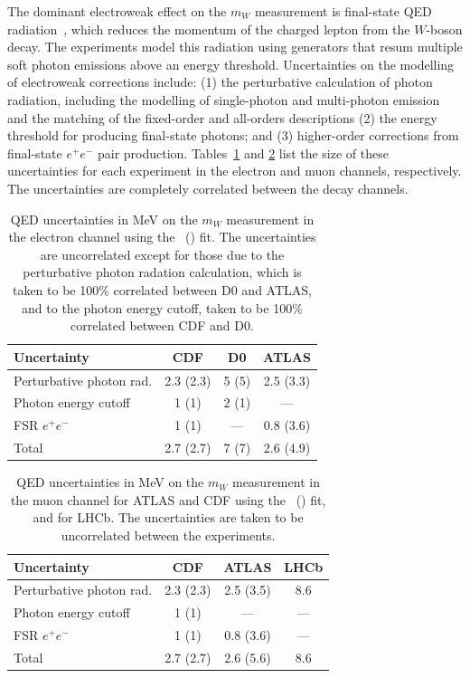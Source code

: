 The dominant electroweak effect on the $m_W$ measurement is final-state QED radiation~\cite{EWK},
which reduces the momentum of the charged lepton from the $W$-boson decay.
The experiments model this radiation using generators that resum multiple soft photon
emissions above an energy threshold. Uncertainties on the modelling of electroweak
corrections include:
(1) the perturbative calculation of photon radiation, including the modelling of single-photon and multi-photon
emission and the matching of the fixed-order and all-orders descriptions
(2) the energy threshold for producing final-state photons; and 
(3) higher-order corrections from final-state $e^+ e^-$ pair production.
Tables~\ref{tbl:ewkelectrons} and  \ref{tbl:ewkmuons} list the size of these uncertainties
for each experiment in the electron and muon channels, respectively.
The uncertainties are completely correlated between the decay channels.

\begin{table}[!tp]
  \centering 
  \begin{tabular}{lccc}
  \hline \hline 
     Uncertainty        & CDF       & D0     & ATLAS     \\ 
     \hline 
    Perturbative photon rad.   & 2.3 (2.3) & 5 (5) & 2.5 (3.3) \\ 
    Photon energy cutoff  & 1 (1)  & 2 (1) & ---    \\
    FSR $e^+e^-$       & 1 (1)     & ---  & 0.8 (3.6) \\
    \hline 
    Total              & 2.7 (2.7)     & 7 (7) & 2.6 (4.9) \\
    \hline \hline 
  \end{tabular}
  \caption{QED uncertainties in MeV on the $m_W$ measurement in the electron 
  channel using the \mT~(\pT) fit.  The uncertainties are uncorrelated except
  for those due to the perturbative photon radation calculation, which is taken
  to be 100\% correlated between D0 and ATLAS, and to the
  photon energy cutoff, taken to be 100\% correlated between CDF and D0. 
  }  
\label{tbl:ewkelectrons}
\end{table}

\begin{table}[!tp]
  \centering 
  \begin{tabular}{lccc}
  \hline \hline 
    Uncertainty          & CDF       & ATLAS     & LHCb \\
    \hline 
    Perturbative photon rad.   & 2.3 (2.3) & 2.5 (3.5) & 8.6 \\
    Photon energy cutoff & 1 (1)  & ---          & --- \\ 
    FSR $e^+e^-$         & 1 (1)     & 0.8 (3.6) & --- \\ 
    Total                & 2.7 (2.7) & 2.6 (5.6) & 8.6 \\
\hline \hline
  \end{tabular}
  \caption{QED uncertainties in MeV on the $m_W$ measurement in the muon 
  channel for ATLAS and CDF using the \mT~(\pT) fit, and for LHCb. 
  The uncertainties are taken to be uncorrelated between the experiments.
  }  
\label{tbl:ewkmuons}
\end{table}

